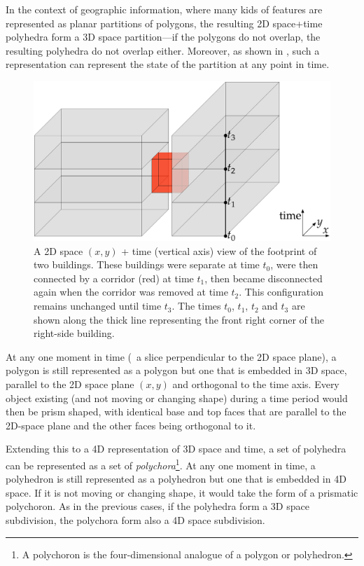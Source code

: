 In the context of geographic information, where many kids of features are represented as planar partitions of polygons, the resulting 2D space+time polyhedra form a 3D space partition---if the polygons do not overlap, the resulting polyhedra do not overlap either.
Moreover, as shown in , such a representation can represent the state of the partition at any point in time.
\begin{figure}[tbp]
\begin{center}
\includegraphics[width=0.85\linewidth]{figs/2d+time}
\caption[A 3D representation of 2D space+time]{A 2D space $(x,y)$ + time (vertical axis) view of the footprint of two buildings. These buildings were separate at time $t_{0}$, were then connected by a corridor (red) at time $t_{1}$, then became disconnected again when the corridor was removed at time $t_{2}$. This configuration remains unchanged until time $t_{3}$. The times $t_0$, $t_1$, $t_2$ and $t_3$ are shown along the thick line representing the front right corner of the right-side building.}
\label{fig:2d+time}
\end{center}
\end{figure}
At any one moment in time (\ie\ a slice perpendicular to the 2D space plane), a polygon is still represented as a polygon but one that is embedded in 3D space, parallel to the 2D space plane $(x,y)$ and orthogonal to the time axis.
Every object existing (and not moving or changing shape) during a time period would then be prism shaped, with identical base and top faces that are parallel to the 2D-space plane and the other faces being orthogonal to it.

Extending this to a 4D representation of 3D space and time, a set of polyhedra can be represented as a set of \emph{polychora}\footnote{A polychoron is the four-dimensional analogue of a polygon or polyhedron.}.
At any one moment in time, a polyhedron is still represented as a polyhedron but one that is embedded in 4D space.
If it is not moving or changing shape, it would take the form of a prismatic polychoron.
As in the previous cases, if the polyhedra form a 3D space subdivision, the polychora form also a 4D space subdivision.

